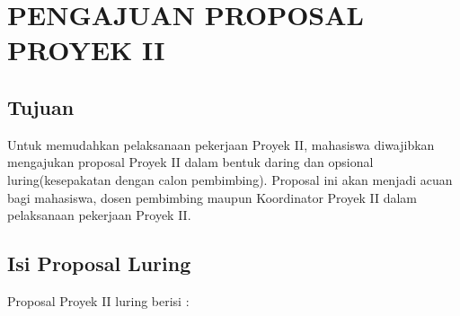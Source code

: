 \chapter{PENGAJUAN PROPOSAL PROYEK II}
\section{Tujuan}
Untuk	memudahkan	pelaksanaan	pekerjaan	Proyek II,	mahasiswa	diwajibkan	mengajukan	proposal	 Proyek II dalam	 bentuk	 daring dan	 opsional	 luring(kesepakatan	 dengan	 calon	pembimbing).	 Proposal	 ini	 akan	 menjadi	 acuan	 bagi	 mahasiswa,	 dosen	 pembimbing	maupun	Koordinator	Proyek	II	dalam	pelaksanaan	pekerjaan	Proyek II.

\section{Isi Proposal Luring}
Proposal	Proyek II luring	berisi	:

